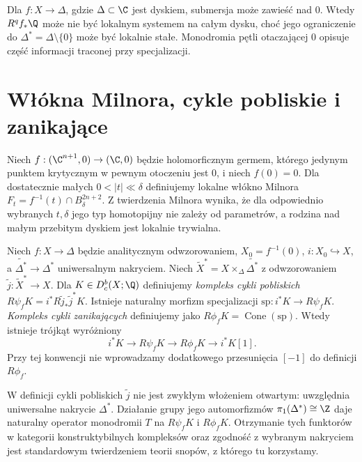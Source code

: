 \begin{uwaga}
Dla $f:X\to\Delta$, gdzie $\Delta\subset\C$ jest dyskiem,
submersja może zawieść nad $0$. Wtedy
$R^qf_*\Q$ może nie być lokalnym systemem na całym dysku,
choć jego ograniczenie do $\Delta^*=\Delta\setminus\{0\}$
może być lokalnie stałe. Monodromia pętli otaczającej
$0$ opisuje część informacji traconej przy specjalizacji.
\end{uwaga}

\section{Włókna Milnora, cykle pobliskie i zanikające}
\begin{definicja}
Niech $f:(\C^{n+1},0)\to(\C,0)$ będzie holomorficznym
germem, którego jedynym punktem krytycznym w
pewnym otoczeniu jest $0$, i niech $f(0)=0$.
Dla dostatecznie małych $0<|t|\ll\delta$ definiujemy
lokalne włókno Milnora
$F_t=f^{-1}(t)\cap B_\delta^{2n+2}$.
Z twierdzenia Milnora wynika, że dla odpowiednio
wybranych $t,\delta$ jego typ homotopijny nie
zależy od parametrów, a rodzina nad małym
przebitym dyskiem jest lokalnie trywialna.
\end{definicja}

\begin{definicja}
\label{def:nearby-vanishing-xiv}
Niech $f:X\to\Delta$ będzie analitycznym odwzorowaniem,
$X_0=f^{-1}(0)$, $i:X_0\hookrightarrow X$, a
$\widetilde{\Delta^*}\to\Delta^*$ uniwersalnym nakryciem.
Niech $\widetilde X^*=X\times_\Delta\widetilde{\Delta^*}$
z odwzorowaniem $\widetilde j:\widetilde X^*\to X$.
Dla $K\in D_c^b(X;\Q)$ definiujemy
\emph{kompleks cykli pobliskich}
$R\psi_f K=i^*R\widetilde j_*\widetilde j^*K$.
Istnieje naturalny morfizm specjalizacji
$\mathrm{sp}:i^*K\to R\psi_fK$.
\emph{Kompleks cykli zanikających} definiujemy jako
$R\phi_fK=\operatorname{Cone}(\mathrm{sp})$.
Wtedy istnieje trójkąt wyróżniony
\[
i^*K\longrightarrow R\psi_fK
\longrightarrow R\phi_fK\longrightarrow i^*K[1].
\]
Przy tej konwencji nie wprowadzamy dodatkowego
przesunięcia $[-1]$ do definicji $R\phi_f$.
\end{definicja}
\begin{uwaga}
W definicji cykli pobliskich $\widetilde j$
nie jest zwykłym włożeniem otwartym:
uwzględnia uniwersalne nakrycie $\Delta^*$.
Działanie grupy jego automorfizmów
$\pi_1(\Delta^*)\cong\Z$ daje naturalny
operator monodromii $T$ na $R\psi_fK$ i $R\phi_fK$.
Otrzymanie tych funktorów w kategorii
konstruktybilnych kompleksów oraz zgodność
z wybranym nakryciem jest standardowym twierdzeniem
teorii snopów, z którego tu korzystamy.
\end{uwaga}

